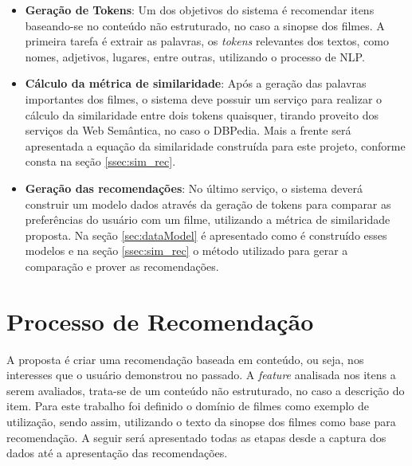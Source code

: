 \begin{itemize}
	\item{\textbf{Geração de Tokens}: Um dos objetivos do sistema é recomendar itens baseando-se no conteúdo não estruturado, no caso a sinopse dos filmes. A primeira tarefa é extrair as palavras, os \textit{tokens} relevantes dos textos, como nomes, adjetivos, lugares, entre outras, utilizando o processo de \ac{NLP}.}
	
	\item{\textbf{Cálculo da métrica de similaridade}: Após a geração das palavras importantes dos filmes, o sistema deve possuir um serviço para realizar o cálculo da similaridade entre dois tokens quaisquer, tirando proveito dos serviços da Web Semântica, no caso o DBPedia. Mais a frente será apresentada a equação da similaridade construída para este projeto, conforme consta na seção \ref{ssec:sim_rec}.}
	
	\item{\textbf{Geração das recomendações}: No último serviço, o sistema deverá construir um modelo dados através da geração de tokens para comparar as preferências do usuário com um filme, utilizando a métrica de similaridade proposta. Na seção \ref{sec:dataModel} é apresentado como é construído esses modelos e na seção \ref{ssec:sim_rec} o método utilizado para gerar a comparação e prover as recomendações.}
\end{itemize}

\section{Processo de Recomendação}

A proposta é criar uma recomendação baseada em conteúdo, ou seja, nos interesses que o usuário demonstrou no passado. A \textit{feature} analisada nos itens a serem avaliados, trata-se de um conteúdo não estruturado, no caso a descrição do item. Para este trabalho foi definido o domínio de filmes como exemplo de utilização, sendo assim, utilizando o texto da sinopse dos filmes como base para recomendação. A seguir será apresentado todas as etapas desde a captura dos dados até a apresentação das recomendações.

